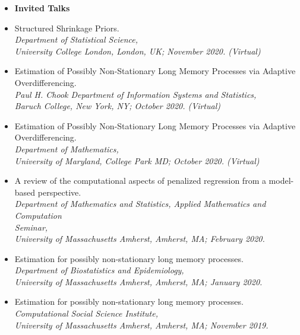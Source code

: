 \documentclass[11pt]{article}
\newcommand{\tab}{\hspace*{2em}}
\begin{document}
\begin{itemize}
	\item[] \textbf{Invited Talks} \vspace{-2mm}
	\item[] Structured Shrinkage Priors. \\
	\tab \emph{Department of Statistical Science,}\\ 
	\tab \emph{University College London, London, UK; November 2020. (Virtual)} \vspace{-2mm}
	\item[] Estimation of Possibly Non-Stationary Long Memory Processes via Adaptive \\
	Overdifferencing. \\
	\tab \emph{Paul H. Chook Department of Information Systems and Statistics,}\\ 
	\tab \emph{Baruch College, New York, NY; October 2020. (Virtual)} \vspace{-2mm}
	\item[] Estimation of Possibly Non-Stationary Long Memory Processes via Adaptive \\
	Overdifferencing. \\
	\tab \emph{Department of Mathematics,}\\ 
	\tab \emph{University of Maryland, College Park MD; October 2020. (Virtual)} \vspace{-2mm}
	\item[] A review of the computational aspects of penalized regression from a model-based perspective. \\
	\tab \emph{Department of Mathematics and Statistics, Applied Mathematics and Computation} \\
	\tab \emph{Seminar,}\\ 
	\tab \emph{University of Massachusetts Amherst, Amherst, MA; February 2020.} \vspace{-2mm}
	\item[] Estimation for possibly non-stationary long memory processes. \\
	\tab \emph{Department of Biostatistics and Epidemiology,}\\ 
	\tab \emph{University of Massachusetts Amherst, Amherst, MA; January 2020.} \vspace{-2mm}
	\item[] Estimation for possibly non-stationary long memory processes. \\
	\tab \emph{Computational Social Science Institute,}\\ 
	\tab \emph{University of Massachusetts Amherst, Amherst, MA; November 2019.} \vspace{-2mm}

\end{itemize}
\end{document}
